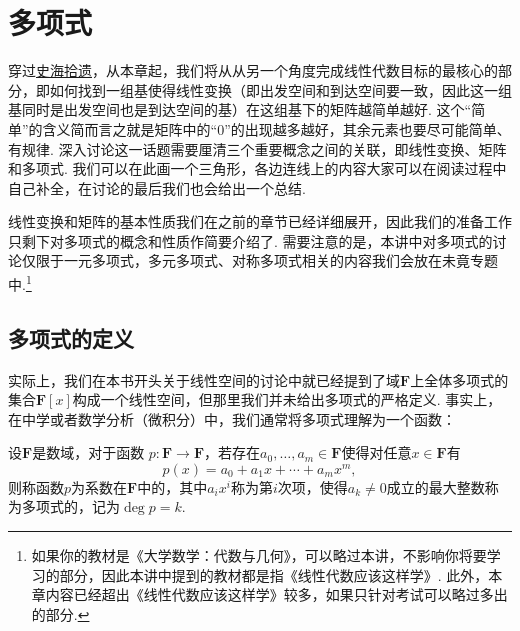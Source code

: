 \chapter{多项式}

穿过\hyperref[chap:史海拾遗]{史海拾遗}，从本章起，我们将从从另一个角度完成线性代数目标的最核心的部分，即如何找到一组基使得线性变换（即出发空间和到达空间要一致，因此这一组基同时是出发空间也是到达空间的基）在这组基下的矩阵越简单越好. 这个``简单''的含义简而言之就是矩阵中的``0''的出现越多越好，其余元素也要尽可能简单、有规律. 深入讨论这一话题需要厘清三个重要概念之间的关联，即线性变换、矩阵和多项式. 我们可以在此画一个三角形，各边连线上的内容大家可以在阅读过程中自己补全，在讨论的最后我们也会给出一个总结.

\begin{figure}[H]
    \centering
\end{figure}

线性变换和矩阵的基本性质我们在之前的章节已经详细展开，因此我们的准备工作只剩下对多项式的概念和性质作简要介绍了. 需要注意的是，本讲中对多项式的讨论仅限于一元多项式，多元多项式、对称多项式相关的内容我们会放在未竟专题中.\footnote{如果你的教材是《大学数学：代数与几何》，可以略过本讲，不影响你将要学习的部分，因此本讲中提到的教材都是指《线性代数应该这样学》. 此外，本章内容已经超出《线性代数应该这样学》较多，如果只针对考试可以略过多出的部分.}

\section{多项式的定义}

实际上，我们在本书开头关于线性空间的讨论中就已经提到了域$\mathbf{F}$上全体多项式的集合$\mathbf{F}[x]$构成一个线性空间，但那里我们并未给出多项式的严格定义. 事实上，在中学或者数学分析（微积分）中，我们通常将多项式理解为一个函数：
\begin{definition}[数域上的多项式函数]  \label{def:14:多项式函数}
    设$\mathbf{F}$是数域，对于函数 $p:\mathbf{F}\to\mathbf{F}$，若存在$a_0,\ldots,a_m\in\mathbf{F}$使得对任意$x\in\mathbf{F}$有
    \begin{equation}
        p(x)=a_0+a_1x+\cdots+a_mx^m,
    \end{equation}
    则称函数$p$为系数在$\mathbf{F}$中的，其中$a_ix^i$称为第$i$次项，使得$a_k\neq 0$成立的最大整数称为多项式的，记为$\deg p=k$.
\end{definition}

